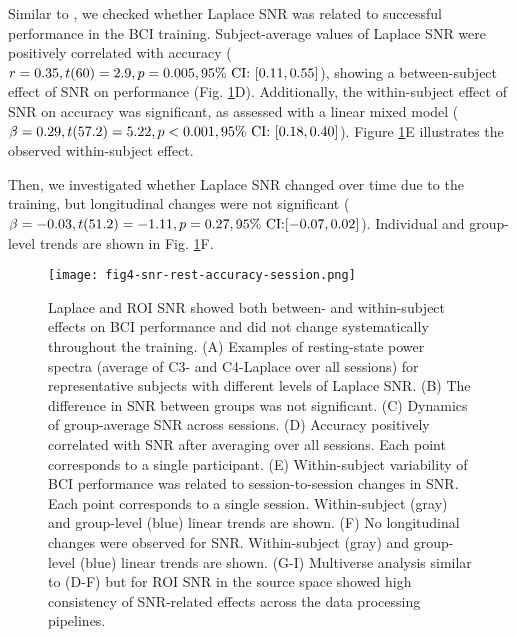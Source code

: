 Similar to \citep{Blankertz2010}, we checked whether Laplace SNR was related to successful performance in the BCI training. Subject-average values of Laplace SNR were positively correlated with accuracy ($r=0.35, t(60) = 2.9, p = 0.005, 95\%~\text{CI:}~ [0.11, 0.55]$), showing a between-subject effect of SNR on performance (Fig. \ref{fig:snr_vs_accuracy_session_combined}D). Additionally, the within-subject effect of SNR on accuracy was significant, as assessed with a linear mixed model ($\beta = 0.29, t(57.2) = 5.22, p < 0.001, 95\%~\text{CI:}~ [0.18, 0.40]$). Figure \ref{fig:snr_vs_accuracy_session_combined}E illustrates the observed within-subject effect.

\medskip

Then, we investigated whether Laplace SNR changed over time due to the training, but longitudinal changes were not significant ($\beta = -0.03, t(51.2) = -1.11, p = 0.27, 95\%~\text{CI:}\allowbreak[-0.07, 0.02]$). Individual and group-level trends are shown in Fig. \ref{fig:snr_vs_accuracy_session_combined}F.

\begin{figure}[htbp]
    \centering
    \texttt{[image: fig4-snr-rest-accuracy-session.png]}
    \caption{Laplace and ROI SNR showed both between- and within-subject effects on BCI performance and did not change systematically throughout the training. (A) Examples of resting-state power spectra (average of C3- and C4-Laplace over all sessions) for representative subjects with different levels of Laplace SNR. (B) The difference in SNR between groups was not significant. (C) Dynamics of group-average SNR across sessions. (D) Accuracy positively correlated with SNR after averaging over all sessions. Each point corresponds to a single participant. (E) Within-subject variability of BCI performance was related to session-to-session changes in SNR. Each point corresponds to a single session. Within-subject (gray) and group-level (blue) linear trends are shown. (F) No longitudinal changes were observed for SNR. Within-subject (gray) and group-level (blue) linear trends are shown. (G-I) Multiverse analysis similar to (D-F) but for ROI SNR in the source space showed high consistency of SNR-related effects across the data processing pipelines.}
    \label{fig:snr_vs_accuracy_session_combined}
\end{figure}

